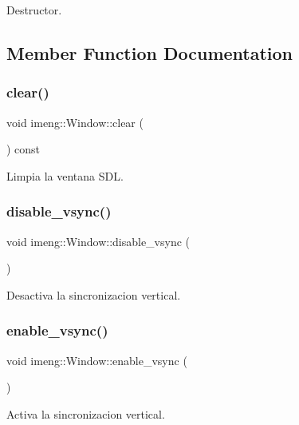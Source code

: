 Destructor. 



\subsection{Member Function Documentation}
\mbox{\label{classimeng_1_1_window_a98ea366feef3825991503d42a53fd5a8}} 
\subsubsection{clear()}
{\footnotesize\ttfamily void imeng\+::\+Window\+::clear (\begin{DoxyParamCaption}{ }\end{DoxyParamCaption}) const}



Limpia la ventana S\+DL. 

\mbox{\label{classimeng_1_1_window_a7103262f607b31adb446fdca0e90b34f}} 
\subsubsection{disable\_vsync()}
{\footnotesize\ttfamily void imeng\+::\+Window\+::disable\+\_\+vsync (\begin{DoxyParamCaption}{ }\end{DoxyParamCaption})}



Desactiva la sincronizacion vertical. 

\mbox{\label{classimeng_1_1_window_a1c0b9ebce042bb6a11b1067f770e95df}} 
\subsubsection{enable\_vsync()}
{\footnotesize\ttfamily void imeng\+::\+Window\+::enable\+\_\+vsync (\begin{DoxyParamCaption}{ }\end{DoxyParamCaption})}



Activa la sincronizacion vertical. 

\mbox{\label{classimeng_1_1_window_ac8a84062d82e17022a9ec4c3992a69ed}} 
